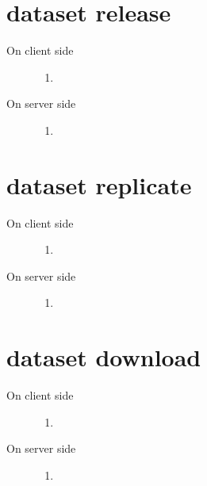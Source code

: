 \documentclass{scrreprt}
\begin{document}
\section{dataset release} 
\begin{description}

%
\item[On client side] \hfill
\begin{enumerate} 
\item

\end{enumerate}
%
\item[On server side] \hfill
\begin{enumerate} 
\item

\end{enumerate}

\end{description}



\section{dataset replicate} 
\begin{description}

%
\item[On client side] \hfill
\begin{enumerate} 
\item

\end{enumerate}
%
\item[On server side] \hfill
\begin{enumerate} 
\item

\end{enumerate}

\end{description}



\section{dataset download} 
\begin{description}

%
\item[On client side] \hfill
\begin{enumerate} 
\item

\end{enumerate}
%
\item[On server side] \hfill
\begin{enumerate} 
\item

\end{enumerate}

\end{description}
\end{document}
